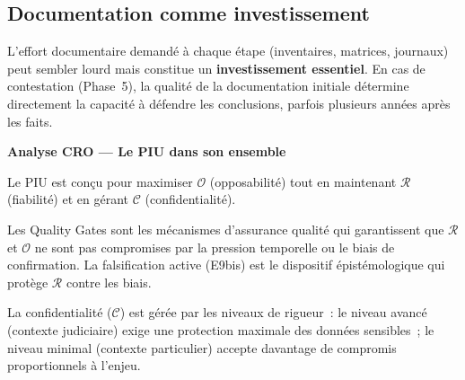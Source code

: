 \subsection{Documentation comme investissement}

L'effort documentaire demandé à chaque étape (inventaires, matrices, journaux)
peut sembler lourd mais constitue un \textbf{investissement essentiel}.
En cas de contestation (Phase~5), la qualité de la documentation initiale
détermine directement la capacité à défendre les conclusions, parfois plusieurs
années après les faits.

\begin{boxCRO}
\textbf{Analyse CRO --- Le PIU dans son ensemble}

Le PIU est conçu pour maximiser $\mathcal{O}$ (opposabilité) tout en
maintenant $\mathcal{R}$ (fiabilité) et en gérant $\mathcal{C}$ (confidentialité).

Les Quality Gates sont les mécanismes d'assurance qualité qui garantissent
que $\mathcal{R}$ et $\mathcal{O}$ ne sont pas compromises par la pression
temporelle ou le biais de confirmation. La falsification active (E9bis) est
le dispositif épistémologique qui protège $\mathcal{R}$ contre les biais.

La confidentialité ($\mathcal{C}$) est gérée par les niveaux de rigueur~:
le niveau avancé (contexte judiciaire) exige une protection maximale des
données sensibles~; le niveau minimal (contexte particulier) accepte
davantage de compromis proportionnels à l'enjeu.

\end{boxCRO}

\separateur

